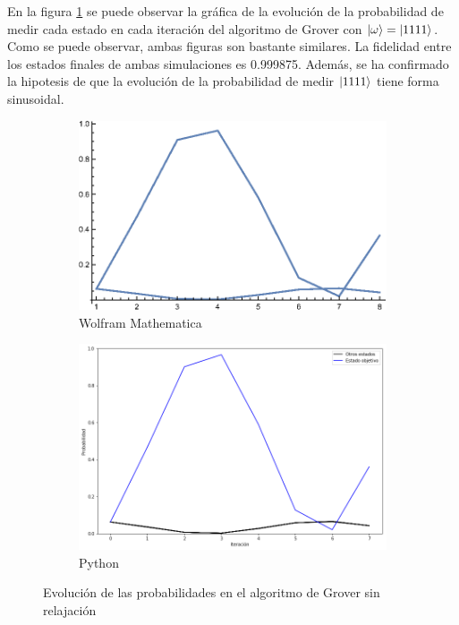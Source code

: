 En la figura \ref{fig:groverlosslesscomp1111} se puede observar la gráfica de la evolución de la probabilidad de medir cada estado en cada iteración del algoritmo de Grover con $\ket{\omega} = \ket{1111}$. Como se puede observar, ambas figuras son bastante similares. La fidelidad entre los estados finales de ambas simulaciones es 0.999875. Además, se ha confirmado la hipotesis de que la evolución de la probabilidad de medir $\ket{1111}$ tiene forma sinusoidal.

\begin{figure}[H]
    \centering
    \begin{subfigure}[m]{0.49\textwidth}
        \centering
        \includegraphics[width=0.9\linewidth]{img/Grover-2_gr1.eps}
        \caption{Wolfram Mathematica}
    \end{subfigure}
    \begin{subfigure}[m]{0.49\textwidth}
        \centering
        \includegraphics[width=0.9\linewidth]{img/groveralllossless.png}
        \caption{Python}
    \end{subfigure}
    \caption[Evolución de las probabilidades en el algoritmo de Grover sin relajación]{Evolución de las probabilidades en el algoritmo de Grover sin relajación}
    \label{fig:groverlosslesscomp1111}
\end{figure}

